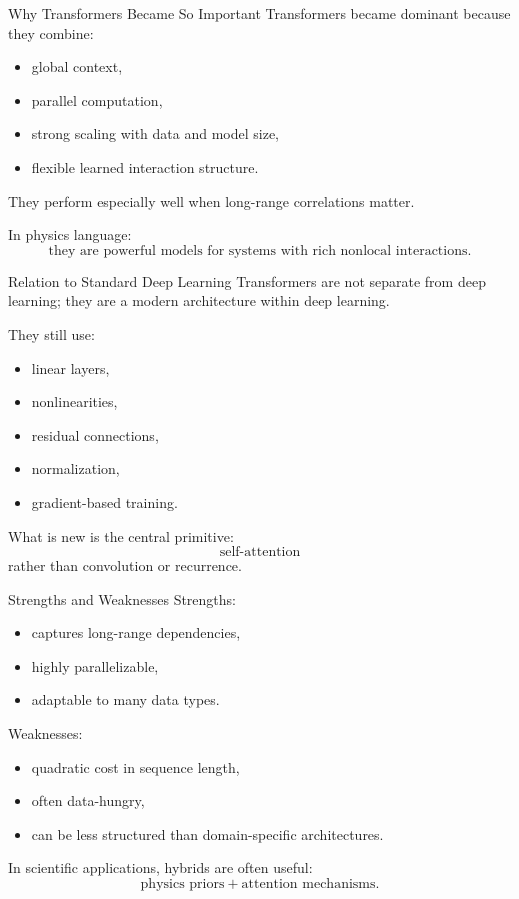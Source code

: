 \documentclass{beamer}
\begin{document}
\begin{frame}{Why Transformers Became So Important}
  Transformers became dominant because they combine:
  \begin{itemize}
  \item global context,
  \item parallel computation,
  \item strong scaling with data and model size,
  \item flexible learned interaction structure.
  \end{itemize}

  They perform especially well when long-range correlations matter.

  In physics language:
  \[
  \text{they are powerful models for systems with rich nonlocal interactions.}
  \]
\end{frame}

\begin{frame}{Relation to Standard Deep Learning}
  Transformers are not separate from deep learning; they are a modern architecture within deep learning.

  They still use:
  \begin{itemize}
  \item linear layers,
  \item nonlinearities,
  \item residual connections,
  \item normalization,
  \item gradient-based training.
  \end{itemize}

  What is new is the central primitive:
  \[
  \boxed{\text{self-attention}}
  \]
  rather than convolution or recurrence.
\end{frame}

\begin{frame}{Strengths and Weaknesses}
  Strengths:
  \begin{itemize}
  \item captures long-range dependencies,
  \item highly parallelizable,
  \item adaptable to many data types.
  \end{itemize}

  Weaknesses:
  \begin{itemize}
  \item quadratic cost in sequence length,
  \item often data-hungry,
  \item can be less structured than domain-specific architectures.
  \end{itemize}

  In scientific applications, hybrids are often useful:
  \[
  \text{physics priors} + \text{attention mechanisms}.
  \]
\end{frame}
\end{document}

